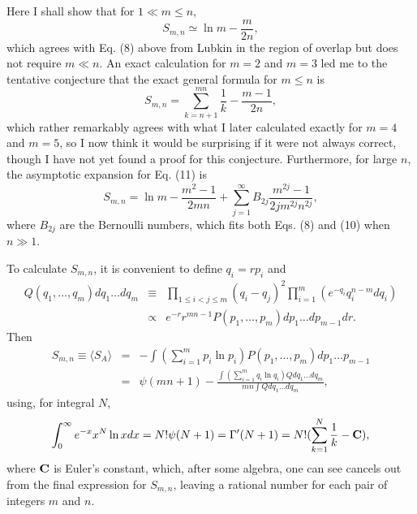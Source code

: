 \documentclass[12pt]{article}
\begin{document}
Here I shall show that for $1\ll m\leq n$,
	\begin{equation}
	S_{m,n} \simeq \ln m - \frac{m}{2n},
	\end{equation}
which agrees with Eq. (8) above from Lubkin \cite{L1} in the region
of overlap
but does not require $m\ll n$.  An exact calculation for $m=2$ and
$m=3$ led me
to the tentative conjecture that the exact general formula for $m\leq
n$ is
	\begin{equation}
	S_{m,n}=\sum_{k=n+1}^{mn}\frac{1}{k} - \frac{m-1}{2n},
	\end{equation}
which rather remarkably agrees with what I later calculated exactly
for $m=4$
and $m=5$, so I now think it would be surprising if it were not
always correct,
though I have not yet found a proof for this conjecture.
Furthermore, for
large $n$, the asymptotic expansion for Eq. (11) is
	\begin{equation}
	S_{m,n}=\ln m - \frac{m^2-1}{2mn}
	+ \sum_{j=1}^{\infty} B_{2j} \frac{m^{2j}-1}{2jm^{2j}n^{2j}},
	\end{equation}
where $B_{2j}$ are the Bernoulli numbers, which fits both Eqs. (8)
and (10)
when $n\gg 1$.

To calculate $S_{m,n}$, it is convenient to define $q_i = rp_i$ and
	\begin{eqnarray}
	Q(q_1,\ldots,q_m)dq_1\ldots dq_m &\equiv &
	\prod_{1\leq i<j\leq m} (q_i-q_j)^2
	\prod_{i=1}^{m} (e^{-q_i}q_i^{n-m}dq_i) \nonumber \\
	 &\propto &e^{-r}r^{mn-1}P(p_1,\ldots,p_m)dp_1\ldots
dp_{m-1}dr.
	\end{eqnarray}
Then
	\begin{eqnarray}
	S_{m,n} \equiv \langle S_A\rangle &=&
	-\int (\sum_{i=1}^{m} p_i \ln p_i)P(p_1,\ldots,p_m)dp_1\ldots
p_{m-1}
	\nonumber \\&=&
	\psi(mn+1)-\frac{\int (\sum_{i=1}^{m}q_i \ln q_i)Q dq_1\ldots
dq_m}
	{mn\int Q dq_1\ldots dq_m},
	\end{eqnarray}
using, for integral $N$,
	\begin{equation}
	\int_{0}^{\infty}e^{-x}x^N\ln x dx = N!\psi (N+1) =
	\Gamma'(N+1) = N!(\sum_{k=1}^{N}\frac{1}{k} - \bf C),
	\end{equation}
where $\bf C$ is Euler's constant, which, after some algebra, one can
see
cancels out from the final expression for $S_{m,n}$, leaving a
rational number
for each pair of integers $m$ and $n$.
\end{document}
